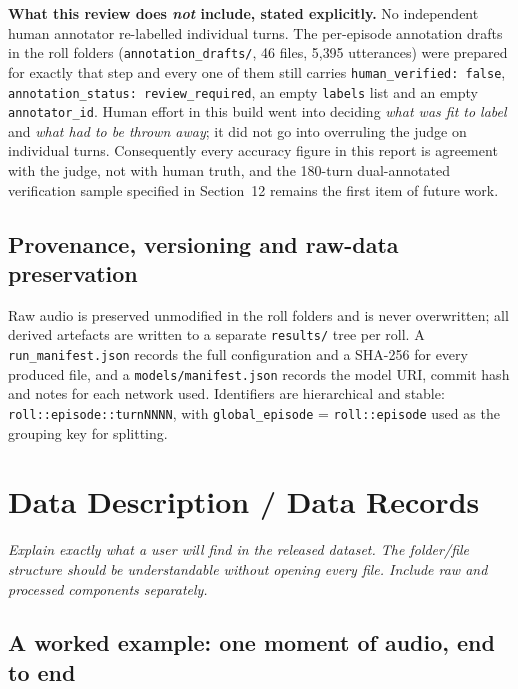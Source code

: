 \documentclass[11pt,a4paper]{article}
\begin{document}
\textbf{What this review does \emph{not} include, stated explicitly.} No independent human
annotator re-labelled individual turns. The per-episode annotation drafts in the roll folders
(\texttt{annotation\_drafts/}, 46 files, 5{,}395 utterances) were prepared for exactly that step
and every one of them still carries \texttt{human\_verified: false},
\texttt{annotation\_status: review\_required}, an empty \texttt{labels} list and an empty
\texttt{annotator\_id}. Human effort in this build went into deciding \emph{what was fit to
label} and \emph{what had to be thrown away}; it did not go into overruling the judge on
individual turns. Consequently every accuracy figure in this report is agreement with the judge,
not with human truth, and the 180-turn dual-annotated verification sample specified in
Section~12 remains the first item of future work.

\subsection{Provenance, versioning and raw-data preservation}

Raw audio is preserved unmodified in the roll folders and is never overwritten; all derived
artefacts are written to a separate \texttt{results/} tree per roll. A \texttt{run\_manifest.json}
records the full configuration and a SHA-256 for every produced file, and a
\texttt{models/manifest.json} records the model URI, commit hash and notes for each network used.
Identifiers are hierarchical and stable: \texttt{roll::episode::turnNNNN}, with
\texttt{global\_episode} = \texttt{roll::episode} used as the grouping key for splitting.

\section{Data Description / Data Records}

\emph{\small Explain exactly what a user will find in the released dataset. The folder/file
structure should be understandable without opening every file. Include raw and processed
components separately.}

\subsection{A worked example: one moment of audio, end to end}
\end{document}
